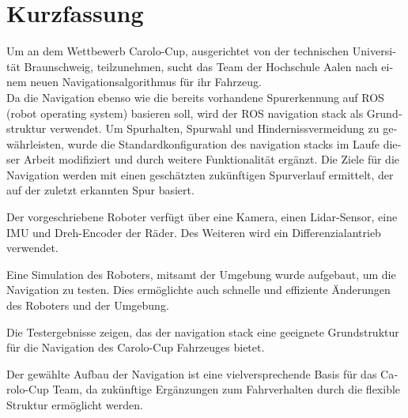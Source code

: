 \chapter*{Kurzfassung}
\label{kurzfassung}

\begin{otherlanguage}{ngerman}
Um an dem Wettbewerb Carolo-Cup, ausgerichtet von der technischen Universität Braunschweig, teilzunehmen, sucht das Team der Hochschule Aalen nach einem neuen Navigationsalgorithmus für ihr Fahrzeug.\\

Da die Navigation ebenso wie die bereits vorhandene Spurerkennung auf ROS (robot operating system) basieren soll, wird der ROS navigation stack als Grundstruktur verwendet. Um Spurhalten, Spurwahl und Hindernissvermeidung zu gewährleisten, wurde die Standardkonfiguration des navigation stacks im Laufe dieser Arbeit modifiziert und durch weitere Funktionalität ergänzt. Die Ziele für die Navigation werden mit einen geschätzten zukünftigen Spurverlauf ermittelt, der auf der zuletzt erkannten Spur basiert.

Der vorgeschriebene Roboter verfügt über eine Kamera, einen Lidar-Sensor, eine IMU und Dreh-Encoder der Räder. Des Weiteren wird ein Differenzialantrieb verwendet.

Eine Simulation des Roboters, mitsamt der Umgebung wurde aufgebaut, um die Navigation zu testen. Dies ermöglichte auch schnelle und effiziente Änderungen des Roboters und der Umgebung.

Die Testergebnisse zeigen, das der navigation stack eine geeignete Grundstruktur für die Navigation des Carolo-Cup Fahrzeuges bietet.

Der gewählte Aufbau der Navigation ist eine vielversprechende Basis für das Carolo-Cup Team, da zukünftige Ergänzungen zum Fahrverhalten durch die flexible Struktur ermöglicht werden.
\end{otherlanguage}
